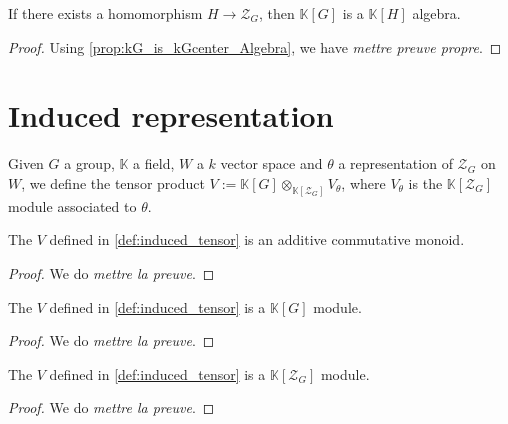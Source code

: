 \begin{proposition}
    \label{prop:kG_is_kH_Algebra}
    \leanok
    If there exists a homomorphism $H\rightarrow \mathcal{Z}_G$, then $\mathbb{K}[G]$
    is a $\mathbb{K}[H]$ algebra.
\end{proposition}
\begin{proof}
    \leanok
    Using \ref{prop:kG_is_kGcenter_Algebra}, we have \textit{mettre preuve propre}.
\end{proof}

\section{Induced representation}

\begin{definition}
    \label{def:induced_tensor}
    \leanok
    Given $G$ a group, $\mathbb{K}$ a field, $W$ a $k$ vector space and $\theta$ a representation of
    $\mathcal{Z}_G$ on $W$, we define the tensor product $V:=\mathbb{K}[G]\otimes_{\mathbb{K}[\mathcal{Z}_G]}V_\theta$,
    where $V_\theta$ is the $\mathbb{K}[\mathcal{Z}_G]$ module associated to $\theta$.
\end{definition}

\begin{proposition}
    \label{prop:induced_add_comm_mono}
    \leanok 
    The $V$ defined in \ref{def:induced_tensor} is an additive commutative monoid.
\end{proposition}
\begin{proof}
    \leanok
    We do \textit{mettre la preuve}.
\end{proof}

\begin{proposition}
    \label{prop:tensor_module_mono}
    \leanok 
    The $V$ defined in \ref{def:induced_tensor} is a $\mathbb{K}[G]$ module.
\end{proposition}
\begin{proof}
    \leanok
    We do \textit{mettre la preuve}.
\end{proof}

\begin{proposition}
    \label{prop:tensor_module_sub}
    \leanok 
    The $V$ defined in \ref{def:induced_tensor} is a $\mathbb{K}[\mathcal{Z}_G]$ module.
\end{proposition}
\begin{proof}
    \leanok
    We do \textit{mettre la preuve}.
\end{proof}

